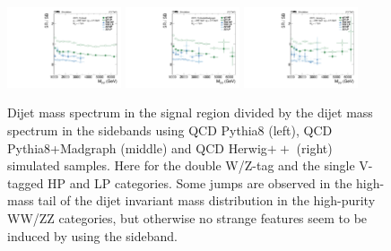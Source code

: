 \begin{figure}[htb]
\centering
\includegraphics[width=0.3\textwidth]{figures/analysis/search2/AN-16-235/plots/MjjSRvsSB_pythia8.pdf}
\includegraphics[width=0.3\textwidth]{figures/analysis/search2/AN-16-235/plots/MjjSRvsSB_pythia8Madgraph.pdf}
\includegraphics[width=0.3\textwidth]{figures/analysis/search2/AN-16-235/plots/MjjSRvsSB_herwig.pdf}
\caption{Dijet mass spectrum in the signal region divided by the dijet mass spectrum in the sidebands using QCD Pythia8 (left), QCD Pythia8+Madgraph (middle) and QCD Herwig$++$ (right) simulated samples. Here for the double W/Z-tag and the single V-tagged HP and LP categories. Some jumps are observed in the high-mass tail of the dijet invariant mass distribution in the high-purity WW/ZZ categories, but otherwise no strange features seem to be induced by using the sideband. }
\label{fig:NPVVvsCat}
\end{figure}

